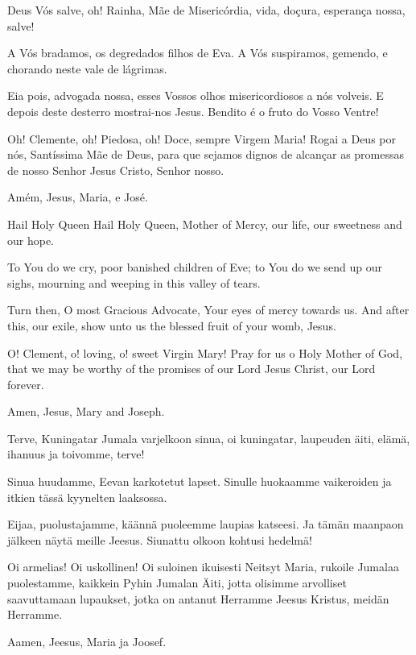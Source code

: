   \begin{passage}[PT]{}
    Deus Vós salve, oh! Rainha, Mãe de Misericórdia,
    vida, doçura, esperança nossa, salve!
    \par
    A Vós bradamos, os degredados filhos de Eva.
    A Vós suspiramos, gemendo, e chorando neste
    vale de lágrimas.
    \par
    Eia pois, advogada nossa, esses Vossos olhos
    misericordiosos a nós volveis.
    E depois deste desterro mostrai-nos Jesus.
    Bendito é o fruto do Vosso Ventre!
    \par
    Oh! Clemente, oh! Piedosa, oh! Doce, sempre
    Virgem Maria!
    Rogai a Deus por nós, Santíssima Mãe de Deus,
    para que sejamos dignos de alcançar as promessas
    de nosso Senhor Jesus Cristo, Senhor nosso.
    \par
    Amém, Jesus, Maria, e José.
  \end{passage}
  \hardbrk
  \begin{passage}[EN]{Hail Holy Queen}
    Hail Holy Queen, Mother of Mercy, our life, our
    sweetness and our hope.
    \par
    To You do we cry, poor banished children of Eve;
    to You do we send up our sighs, mourning and
    weeping in this valley of tears.
    \par
    Turn then, O most Gracious Advocate, Your eyes
    of mercy towards us. And after this, our exile, show unto us the
    blessed fruit of your womb, Jesus.
    \par
    O! Clement, o! loving, o! sweet Virgin Mary!
    Pray for us o Holy Mother of God, that we may
    be worthy of the promises of our Lord Jesus Christ,
    our Lord forever.
    \par
    Amen, Jesus, Mary and Joseph.
  \end{passage}
  \begin{passage}[FI]{Terve, Kuningatar}
    Jumala varjelkoon sinua, oi kuningatar, laupeuden äiti, elämä, ihanuus ja toivomme, terve!
    \par
    Sinua huudamme, Eevan karkotetut lapset. Sinulle huokaamme vaikeroiden ja
    itkien tässä kyynelten laaksossa.
    \par
    Eijaa, puolustajamme, käännä puoleemme laupias katseesi. Ja tämän
    maanpaon jälkeen näytä meille Jeesus. Siunattu olkoon kohtusi hedelmä!
    \par
    Oi armelias! Oi uskollinen! Oi suloinen ikuisesti Neitsyt Maria,
    rukoile Jumalaa puolestamme, kaikkein Pyhin Jumalan Äiti, jotta
    olisimme arvolliset saavuttamaan lupaukset, jotka on antanut
    Herramme Jeesus Kristus, meidän Herramme.
    \par
    Aamen, Jeesus, Maria ja Joosef.
  \end{passage}
\endsong


